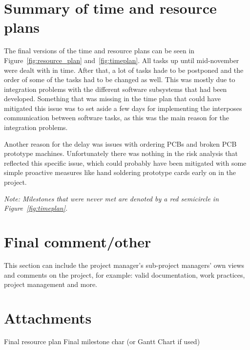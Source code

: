 \documentclass[11pt, titlepage]{article} %
\begin{document}
\section{Summary of time and resource plans}
The final versions of the time and resource plans can be seen in Figure~\ref{fig:resource_plan}
and~\ref{fig:timeplan}. All tasks up until mid-november were dealt with in time. After that,
a lot of tasks hade to be postponed and the order of some of the tasks had to be changed as well.
This was mostly due to integration problems with the different software subsystems that had
been developed. Something that was missing in the time plan that could have mitigated this issue
was to set aside a few days for implementing the interposes communication between software tasks,
as this was the main reason for the integration problems.

Another reason for the delay was issues with ordering PCBs and broken PCB
prototype machines. Unfortunately there was nothing in the risk analysis that reflected
this specific issue, which could probably have been mitigated with some simple proactive
measures like hand soldering prototype cards early on in the project.

\textit{Note: Milestones that were never met are denoted by a red semicircle in
Figure~\ref{fig:timeplan}.}

\section{Final comment/other}
This section can include the project manager's sub-project managers' own views and comments on the project, for example: valid documentation, work practices, project management and more.


\section{Attachments}
Final resource plan
Final milestone char (or Gantt Chart if used)


\clearpage




\clearpage
\clearpage

\appendix
\end{document}
